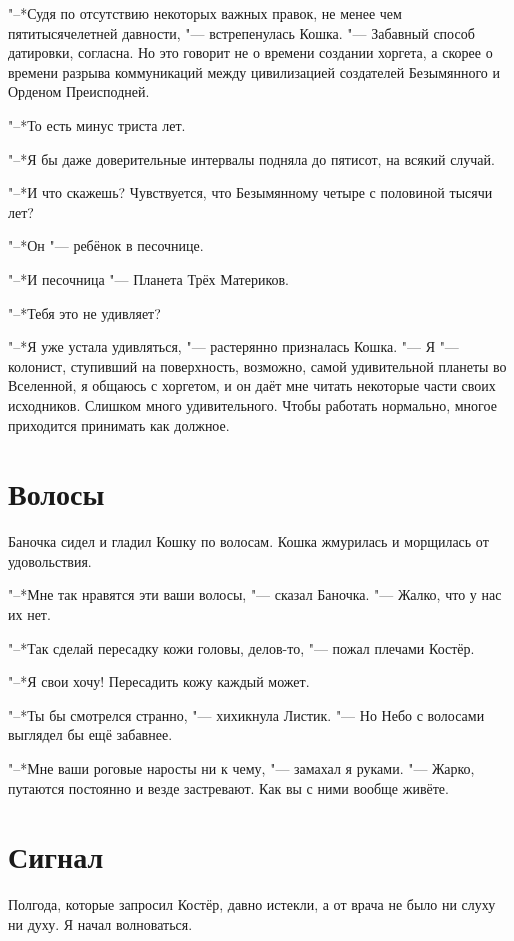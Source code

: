 \documentclass[a4paper,10pt]{book}
\begin{document}
"--*Судя по отсутствию некоторых важных правок, не менее чем пятитысячелетней давности, "--- встрепенулась Кошка. "--- Забавный способ датировки, согласна. Но это говорит не о времени создании хоргета, а скорее о времени разрыва коммуникаций между цивилизацией создателей Безымянного и Орденом Преисподней.

"--*То есть минус триста лет.

"--*Я бы даже доверительные интервалы подняла до пятисот, на всякий случай.

"--*И что скажешь? Чувствуется, что Безымянному четыре с половиной тысячи лет?

"--*Он "--- ребёнок в песочнице.

"--*И песочница "--- Планета Трёх Материков.
 
"--*Тебя это не удивляет?

"--*Я уже устала удивляться, "--- растерянно призналась Кошка.
"--- Я "--- колонист, ступивший на поверхность, возможно, самой удивительной планеты во Вселенной, я общаюсь с хоргетом, и он даёт мне читать некоторые части своих исходников.
Слишком много удивительного.
Чтобы работать нормально, многое приходится принимать как должное.

 \section{Волосы}

 Баночка сидел и гладил Кошку по волосам. Кошка жмурилась и морщилась от удовольствия.

"--*Мне так нравятся эти ваши волосы, "--- сказал Баночка. "--- Жалко, что у нас их нет.

"--*Так сделай пересадку кожи головы, делов-то, "--- пожал плечами Костёр.

"--*Я свои хочу! Пересадить кожу каждый может.

"--*Ты бы смотрелся странно, "--- хихикнула Листик. "--- Но Небо с волосами выглядел бы ещё забавнее.

"--*Мне ваши роговые наросты ни к чему, "--- замахал я руками. "--- Жарко, путаются постоянно и везде застревают. Как вы с ними вообще живёте.
 
 \section{Сигнал}

 Полгода, которые запросил Костёр, давно истекли, а от врача не было ни слуху ни духу. Я начал волноваться.
\end{document}
